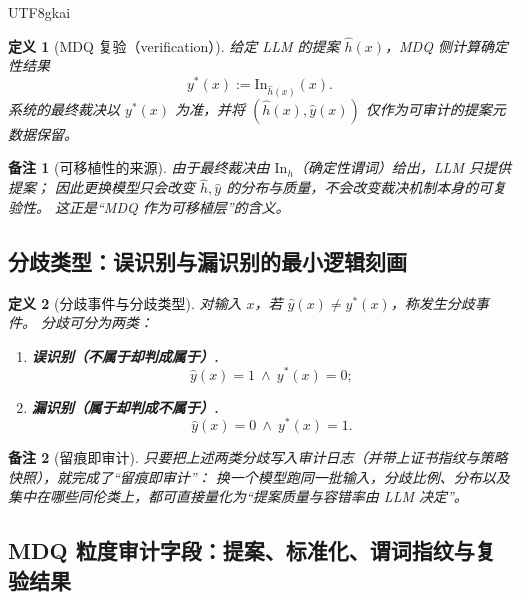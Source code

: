\documentclass[12pt]{article}
\newtheorem{definition}{定义}[section]
\newtheorem{remark}{备注}[section]
\begin{document}
\begin{CJK*}{UTF8}{gkai}
\begin{definition}[MDQ 复验（verification）]
给定 LLM 的提案 $\hat{h}(x)$，MDQ 侧计算确定性结果
\[
y^\ast(x):=\mathrm{In}_{\hat{h}(x)}(x).
\]
系统的最终裁决以 $y^\ast(x)$ 为准，并将 $(\hat{h}(x),\hat{y}(x))$ 仅作为可审计的提案元数据保留。
\end{definition}

\begin{remark}[可移植性的来源]
由于最终裁决由 $\mathrm{In}_h$（确定性谓词）给出，LLM 只提供提案；
因此更换模型只会改变 $\hat{h},\hat{y}$ 的分布与质量，不会改变裁决机制本身的可复验性。
这正是“MDQ 作为可移植层”的含义。
\end{remark}

\subsection{分歧类型：误识别与漏识别的最小逻辑刻画}
\label{subsec:discrepancy-types}

\begin{definition}[分歧事件与分歧类型]
对输入 $x$，若 $\hat{y}(x)\neq y^\ast(x)$，称发生分歧事件。
分歧可分为两类：
\begin{enumerate}
  \item \textbf{误识别（不属于却判成属于）.}
  \[
  \hat{y}(x)=1\ \wedge\ y^\ast(x)=0;
  \]
  \item \textbf{漏识别（属于却判成不属于）.}
  \[
  \hat{y}(x)=0\ \wedge\ y^\ast(x)=1.
  \]
\end{enumerate}
\end{definition}

\begin{remark}[留痕即审计]
只要把上述两类分歧写入审计日志（并带上证书指纹与策略快照），就完成了“留痕即审计”：
换一个模型跑同一批输入，分歧比例、分布以及集中在哪些同伦类上，都可直接量化为“提案质量与容错率由 LLM 决定”。
\end{remark}

\subsection{MDQ 粒度审计字段：提案、标准化、谓词指纹与复验结果}
\label{subsec:homotopy-audit-fields}


\end{CJK*}
\end{document}
